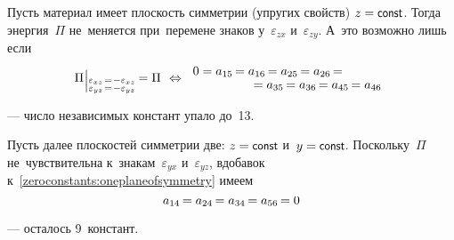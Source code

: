 \begin{otherlanguage}{russian}
Пусть материал имеет плоскость симметрии (упругих свойств) ${z = \const}$. Тогда энергия~$\Pi$ не~меняется при~перемене знаков у~$\varepsilon_{zx}$ и~$\varepsilon_{zy}$. А~это возможно лишь если
\begin{equation}\label{zeroconstants:oneplaneofsymmetry}
\Pi \hspace{0.1ex} \raisemath{-0.2em}{\Bigr\vert}_{\substack{%
\varepsilon_{xz} \hspace{0.2ex}=\hspace{0.2ex} -\varepsilon_{xz} \\
\varepsilon_{yz} \hspace{0.2ex}=\hspace{0.2ex} -\varepsilon_{yz}
}} \hspace{-0.2ex} = \Pi
\:\,\Leftrightarrow \hspace{-3em}
\begin{array}{c}
0 =
a_{15} \hspace{-0.2ex} = a_{16} \hspace{-0.2ex} = a_{25} \hspace{-0.2ex} = a_{26} \hspace{-0.2ex} = \\[-0.1em]
\hspace{8em} = a_{35} \hspace{-0.2ex} = a_{36} \hspace{-0.2ex} = a_{45} \hspace{-0.2ex} = a_{46}
\end{array}
\end{equation}

\noindent --- число независимых констант упало до~13.

Пусть далее плоскостей симметрии две: ${z = \const}$ и~${y = \const}$. Поскольку~$\Pi$ не~чувствительна к~знакам~$\varepsilon_{yx}$ и~$\varepsilon_{yz}$, вдобавок к~\eqref{zeroconstants:oneplaneofsymmetry} имеем
\vspace{-0.8em}\begin{equation}\label{zeroconstants:2orthogonalplanesofsymmetry:orthotropic}
a_{14} \hspace{-0.2ex} = a_{24} \hspace{-0.2ex} = a_{34} \hspace{-0.2ex} = a_{56} \hspace{-0.2ex} = 0
\end{equation}

\vspace{-0.64em}\noindent --- осталось 9~констант.


\end{otherlanguage}
